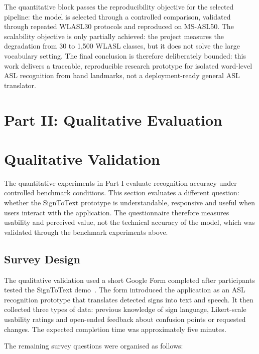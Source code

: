 The quantitative block passes the reproducibility objective for the selected pipeline: the model is
selected through a controlled comparison, validated through repeated WLASL30 protocols and
reproduced on MS-ASL50. The scalability objective is only partially achieved: the project measures
the degradation from 30 to 1{,}500 WLASL classes, but it does not solve the large vocabulary
setting. The final conclusion is therefore deliberately bounded: this work delivers a traceable,
reproducible research prototype for isolated word-level ASL recognition from hand landmarks, not a
deployment-ready general ASL translator.

\section*{Part II: Qualitative Evaluation}

\section{Qualitative Validation}
\label{sec:exp_qualitative}

The quantitative experiments in Part I evaluate recognition accuracy under controlled benchmark
conditions. This section evaluates a different question: whether the SignToText prototype is
understandable, responsive and useful when users interact with the application. The questionnaire
therefore measures usability and perceived value, not the technical accuracy of the model, which
was validated through the benchmark experiments above.

\subsection{Survey Design}
\label{subsec:exp_qual_survey_design}

The qualitative validation used a short Google Form completed after participants tested the
SignToText demo~\cite{signtotextSurvey2026}. The form introduced the application as an ASL
recognition prototype that translates detected signs into text and speech. It then collected three
types of data: previous knowledge of sign language, Likert-scale usability ratings and open-ended
feedback about confusion points or requested changes. The expected completion time was
approximately five minutes.

The remaining survey questions were organised as follows:

